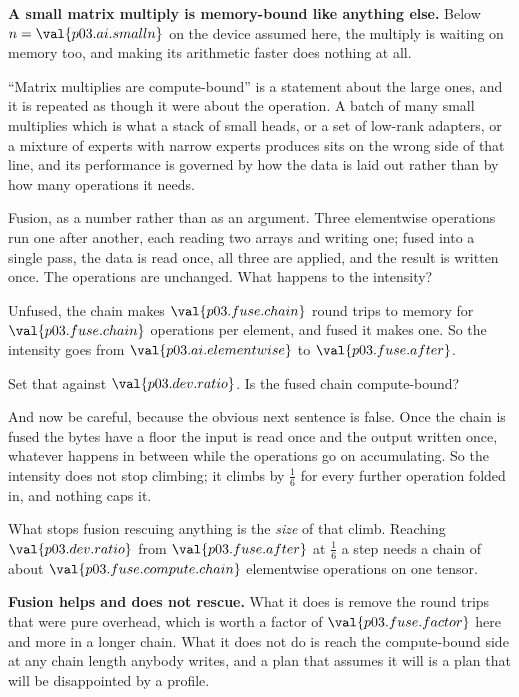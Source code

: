 \begin{fr}
\begin{warning}
\textbf{A small matrix multiply is memory-bound like anything else.} Below
$n = \val{p03.ai.smalln}$ on the device assumed here, the multiply is waiting
on memory too, and making its arithmetic faster does nothing at all.

\enquote{Matrix multiplies are compute-bound} is a statement about the large
ones, and it is repeated as though it were about the operation. A batch of many
small multiplies \dash{} which is what a stack of small heads, or a set of
low-rank adapters, or a mixture of experts with narrow experts produces
\dash{} sits on the wrong side of that line, and its performance is governed by
how the data is laid out rather than by how many operations it needs.
\end{warning}

Fusion, as a number rather than as an argument. Three elementwise operations
run one after another, each reading two arrays and writing one; fused into a
single pass, the data is read once, all three are applied, and the result is
written once. The operations are unchanged. What happens to the intensity?
\dotline
\nextframe
\end{fr}

\begin{fr}

Unfused, the chain makes $\val{p03.fuse.chain}$ round trips to memory for
$\val{p03.fuse.chain}$ operations per element, and fused it makes one. So the
intensity goes from $\val{p03.ai.elementwise}$ to $\val{p03.fuse.after}$.

Set that against $\val{p03.dev.ratio}$. Is the fused chain compute-bound?
\dotline
\nextframe
\end{fr}

\begin{fr}

And now be careful, because the obvious next sentence is false. Once the
chain is fused the bytes have a floor \dash{} the input is read once and the
output written once, whatever happens in between \dash{} while the operations
go on accumulating. So the intensity does not stop climbing; it climbs by
$\frac{1}{6}$ for every further operation folded in, and nothing caps it.

What stops fusion rescuing anything is the \emph{size} of that climb.
Reaching $\val{p03.dev.ratio}$ from $\val{p03.fuse.after}$ at
$\frac{1}{6}$ a step needs a chain of about
$\val{p03.fuse.compute.chain}$ elementwise operations on one tensor.

\textbf{Fusion helps and does not rescue.} What it does is remove the round
trips that were pure overhead, which is worth a factor of
$\val{p03.fuse.factor}$ here and more in a longer chain. What it does not do
is reach the compute-bound side at any chain length anybody writes, and a plan
that assumes it will is a plan that will be disappointed by a profile.
\end{fr}

